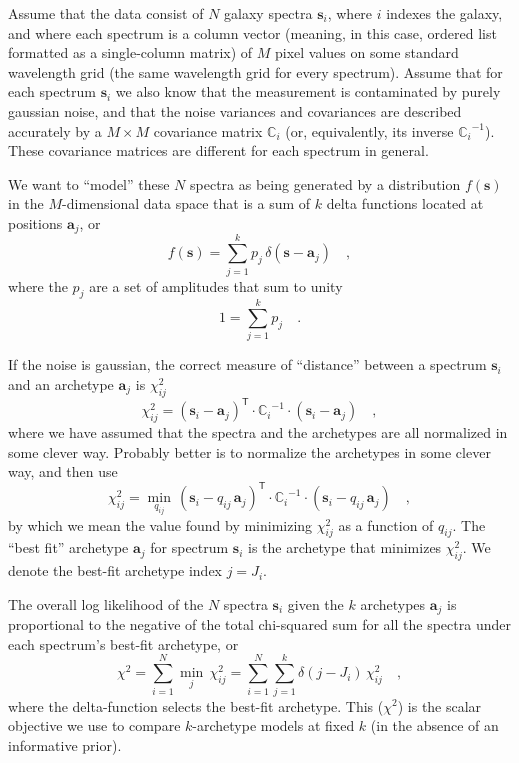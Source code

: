 \documentclass[12pt]{article}
\newcommand{\ampj}{p_j}
\newcommand{\ampij}{q_{ij}}
\newcommand{\chisq}{\chi^2}
\newcommand{\chisqij}{\chisq_{ij}}
\newcommand{\Mvector}[1]{\mathbf{#1}}
\newcommand{\point}{\Mvector{s}}
\newcommand{\spectrumi}{\point_i}
\newcommand{\archetypej}{\Mvector{a}_j}
\newcommand{\Mmatrix}[1]{\mathbb{#1}}
\newcommand{\covari}{\Mmatrix{C}_i}
\newcommand{\inverse}[1]{{#1}^{-1}}
\newcommand{\invcovari}{\inverse{\covari}}
\newcommand{\transpose}[1]{{#1}^{\mathsf{T}}}
\newcommand{\minover}[1]{\min_{#1}\,}
\begin{document}
Assume that the data consist of $N$ galaxy spectra $\spectrumi$, where
$i$ indexes the galaxy, and where each spectrum is a column vector
(meaning, in this case, ordered list formatted as a single-column
matrix) of $M$ pixel values on some standard wavelength grid (the same
wavelength grid for every spectrum).  Assume that for each spectrum
$\spectrumi$ we also know that the measurement is contaminated by
purely gaussian noise, and that the noise variances and covariances
are described accurately by a $M\times M$ covariance matrix $\covari$
(or, equivalently, its inverse $\invcovari$).  These covariance
matrices are different for each spectrum in general.

We want to ``model'' these $N$ spectra as being generated by a
distribution $f(\point)$ in the $M$-dimensional data space that is a
sum of $k$ delta functions located at positions $\archetypej$, or
\begin{equation}
f(\point) = \sum_{j=1}^{k} \ampj\,\delta(\point-\archetypej) \quad ,
\end{equation}
where the $\ampj$ are a set of amplitudes that sum to unity
\begin{equation}
1 = \sum_{j=1}^{k} \ampj \quad .
\end{equation}

If the noise is gaussian, the correct measure of ``distance'' between
a spectrum $\spectrumi$ and an archetype $\archetypej$ is $\chisqij$
\begin{equation}
\chisqij = \transpose{(\spectrumi-\archetypej)}
           \cdot\invcovari\cdot(\spectrumi-\archetypej) \quad ,
\end{equation}
where we have assumed that the spectra and the archetypes are all
normalized in some clever way.  Probably better is to normalize the
archetypes in some clever way, and then use
\begin{equation}
\chisqij = \minover{\ampij}\transpose{(\spectrumi-\ampij\,\archetypej)}
           \cdot\invcovari\cdot(\spectrumi-\ampij\,\archetypej) \quad ,
\end{equation}
by which we mean the value found by minimizing $\chisqij$ as a
function of $\ampij$.  The ``best fit'' archetype $\archetypej$ for
spectrum $\spectrumi$ is the archetype that minimizes $\chisqij$.  We
denote the best-fit archetype index $j=J_i$.

The overall log likelihood of the $N$ spectra $\spectrumi$ given the
$k$ archetypes $\archetypej$ is proportional to the negative of the
total chi-squared sum for all the spectra under each spectrum's
best-fit archetype, or
\begin{equation}
\chisq = \sum_{i=1}^{N} \minover{j}\chisqij
       = \sum_{i=1}^{N}\sum_{j=1}^{k} \delta(j-J_i)\,\chisqij \quad ,
\end{equation}
where the delta-function selects the best-fit archetype.  This
($\chisq$) is the scalar objective we use to compare $k$-archetype
models at fixed $k$ (in the absence of an informative prior).
\end{document}
